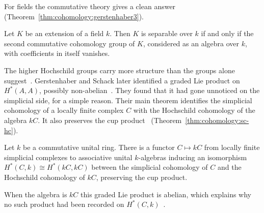 For fields the commutative theory gives a clean answer
(Theorem~\ref{thm:cohomology:gerstenhaber3}).

\begin{theorem}\label{thm:cohomology:gerstenhaber3}
Let $K$ be an extension of a field $k$. Then $K$ is separable over $k$ if and only
if the second commutative cohomology group of $K$, considered as an algebra over
$k$, with coefficients in itself vanishes.
\end{theorem}

The higher Hochschild groups carry more structure than the groups alone
suggest~\cite[p.~144]{GerstenhaberSchack1983}. Gerstenhaber and Schack later
identified a graded Lie product on $H^*(A,A)$, possibly
non-abelian~\cite[p.~144]{GerstenhaberSchack1983}. They found that it had gone
unnoticed on the simplicial side, for a simple reason. Their main theorem
identifies the simplicial cohomology of a locally finite complex $C$ with the
Hochschild cohomology of the algebra $kC$. It also preserves the cup product~
(Theorem~\ref{thm:cohomology:sc-hc})\cite[pp.~143--144]{GerstenhaberSchack1983}.

\begin{theorem}[{SC $=$ HC, \cite[pp.~143--144]{GerstenhaberSchack1983}}]\label{thm:cohomology:sc-hc}
Let $k$ be a commutative unital ring. There is a functor $C \mapsto kC$ from
locally finite simplicial complexes to associative unital $k$-algebras inducing an
isomorphism $H^*(C,k) \cong H^*(kC,kC)$ between the simplicial cohomology of $C$
and the Hochschild cohomology of $kC$, preserving the cup product.
\end{theorem}

When the algebra is $kC$ this graded Lie product is abelian, which explains
why no such product had been recorded on
$H^*(C,k)$~\cite[p.~144]{GerstenhaberSchack1983}.

